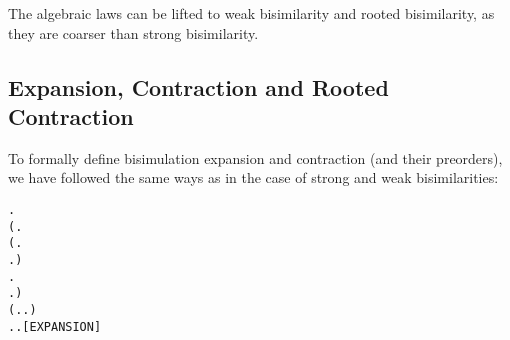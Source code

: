 The algebraic laws can be lifted to weak bisimilarity  and rooted 
 bisimilarity, as  they are coarser than   strong
bisimilarity.

\subsection{Expansion, Contraction and Rooted Contraction}

To formally define bisimulation expansion and contraction (and their preorders), we have
followed the same ways as in the case of strong and weak bisimilarities:
\begin{alltt}
  \HOLSymConst{\HOLTokenDefEquality{}}
  \HOLSymConst{\HOLTokenForall{}} .
         \HOLSymConst{\HOLTokenImp{}}
      (\HOLSymConst{\HOLTokenForall{}}.
           (\HOLSymConst{\HOLTokenForall{}}.
                 \HOLTokenTransBegin{} \HOLTokenTransEnd {} \HOLSymConst{\HOLTokenImp{}}
                \HOLSymConst{\HOLTokenExists{}}.  \HOLTokenTransBegin{} \HOLTokenTransEnd {} \HOLSymConst{\HOLTokenConj{}}   ) \HOLSymConst{\HOLTokenConj{}}
           \HOLSymConst{\HOLTokenForall{}}.
                \HOLTokenTransBegin{} \HOLTokenTransEnd {} \HOLSymConst{\HOLTokenImp{}}
               \HOLSymConst{\HOLTokenExists{}}.  \HOLTokenWeakTransBegin{} \HOLTokenWeakTransEnd {} \HOLSymConst{\HOLTokenConj{}}   ) \HOLSymConst{\HOLTokenConj{}}
      (\HOLSymConst{\HOLTokenForall{}}.  \HOLTokenTransBegin\HOLSymConst{\ensuremath{\tau}}\HOLTokenTransEnd {} \HOLSymConst{\HOLTokenImp{}}    \HOLSymConst{\HOLTokenDisj{}} \HOLSymConst{\HOLTokenExists{}}.  \HOLTokenTransBegin\HOLSymConst{\ensuremath{\tau}}\HOLTokenTransEnd {} \HOLSymConst{\HOLTokenConj{}}   ) \HOLSymConst{\HOLTokenConj{}}
      \HOLSymConst{\HOLTokenForall{}}.  \HOLTokenTransBegin\HOLSymConst{\ensuremath{\tau}}\HOLTokenTransEnd {} \HOLSymConst{\HOLTokenImp{}} \HOLSymConst{\HOLTokenExists{}}.  \HOLTokenWeakTransBegin\HOLSymConst{\ensuremath{\tau}}\HOLTokenWeakTransEnd {} \HOLSymConst{\HOLTokenConj{}}   \hfill{[EXPANSION]}


\end{alltt}
